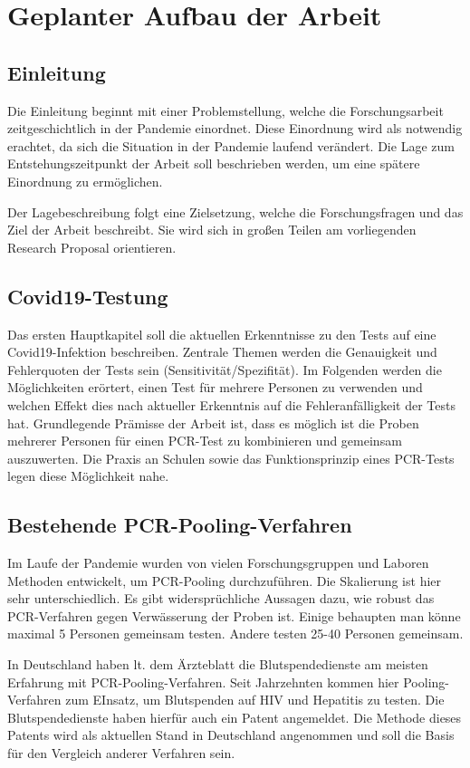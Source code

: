 
\chapter{Geplanter Aufbau der Arbeit}
\section{Einleitung}
Die Einleitung beginnt mit einer Problemstellung, welche die Forschungsarbeit zeitgeschichtlich in der Pandemie einordnet.
Diese Einordnung wird als notwendig erachtet, da sich die Situation in der Pandemie laufend verändert.
Die Lage zum Entstehungszeitpunkt der Arbeit soll beschrieben werden, um eine spätere Einordnung zu ermöglichen.

Der Lagebeschreibung folgt eine Zielsetzung, welche die Forschungsfragen und das Ziel der Arbeit beschreibt.
Sie wird sich in großen Teilen am vorliegenden Research Proposal orientieren.

\section{Covid19-Testung}
Das ersten Hauptkapitel soll die aktuellen Erkenntnisse zu den Tests auf eine Covid19-Infektion beschreiben.
Zentrale Themen werden die Genauigkeit und Fehlerquoten der Tests sein (Sensitivität/Spezifität).
Im Folgenden werden die Möglichkeiten erörtert, einen Test für mehrere Personen zu verwenden und welchen Effekt dies nach aktueller Erkenntnis auf die Fehleranfälligkeit der Tests hat.
Grundlegende Prämisse der Arbeit ist, dass es möglich ist die Proben mehrerer Personen für einen PCR-Test zu kombinieren und gemeinsam auszuwerten.
Die Praxis an Schulen sowie das Funktionsprinzip eines PCR-Tests legen diese Möglichkeit nahe.

\section{Bestehende PCR-Pooling-Verfahren}
Im Laufe der Pandemie wurden von vielen Forschungsgruppen und Laboren Methoden entwickelt, um PCR-Pooling durchzuführen.
Die Skalierung ist hier sehr unterschiedlich.
Es gibt widersprüchliche Aussagen dazu, wie robust das PCR-Verfahren gegen Verwässerung der Proben ist.
Einige behaupten man könne maximal 5 Personen gemeinsam testen.
\cite{Quelle}
Andere testen 25-40 Personen gemeinsam.
\cite{Quelle}

In Deutschland haben lt. dem Ärzteblatt die Blutspendedienste am meisten Erfahrung mit PCR-Pooling-Verfahren.
\cite{Ärzteblatt}
Seit Jahrzehnten kommen hier Pooling-Verfahren zum EInsatz, um Blutspenden auf HIV und Hepatitis zu testen.
Die Blutspendedienste haben hierfür auch ein Patent angemeldet.
\cite{Patent Blutspende}
Die Methode dieses Patents wird als aktuellen Stand in Deutschland angenommen und soll die Basis für den Vergleich anderer Verfahren sein.

